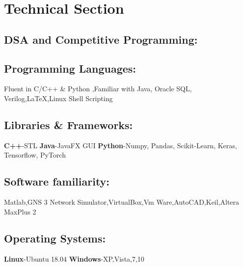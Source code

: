 \documentclass{article}
\begin{document}

\section*{Technical Section}

\subsection*{DSA and Competitive Programming:}

\subsection*{Programming Languages:}
Fluent in C/C++ \& Python ,Familiar with Java, Oracle SQL, Verilog,{\LaTeX},Linux Shell Scripting

\subsection*{Libraries \& Frameworks:}
\textbf{C++}-STL
\textbf{Java}-JavaFX GUI
\textbf{Python}-Numpy, Pandas, Scikit-Learn, Keras, Tensorflow, PyTorch

\subsection*{Software familiarity:}
Matlab,GNS 3 Network Simulator,VirtualBox,Vm Ware,AutoCAD,Keil,Altera MaxPlus 2

\subsection*{Operating Systems:}
\textbf{ Linux}-Ubuntu 18.04
\textbf{ Windows}-XP,Vista,7,10
\end{document}
